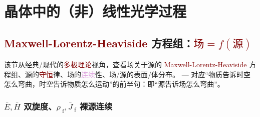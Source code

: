 
\chapter{晶体中的（非）线性光学过程}\label{chap:N/LCO}
\noindent{}
\vspace{-\baselineskip} %

\vspace*{-8.5em}

\section{\textcolor{Maroon}{Maxwell-Lorentz-Heaviside} 方程组：\textcolor{Maroon}{$\text{场} = f(\text{源})$}}\label{sec:maxwell}

该节从经典/现代的\textcolor{Maroon}{多极理论}视角，查看场关于源的 \textcolor{Maroon}{Maxwell-Lorentz-Heaviside} 方程组、源的\textcolor{Maroon}{守恒}律、场的\textcolor{Plum}{连续}性、场/源的表面/体分布。 --- 对应“物质告诉时空怎么弯曲，时空告诉物质怎么运动”的前半句：即“源告诉场怎么弯曲”。

\vspace*{-5.0em}

\subsection{$\bar{E},\bar{H}$ 双旋度、${\rho}_{\;\!\text{f}}, \bar{J}_{\;\!\text{f}}$ 裸源连续}\label{ssec:EHpJf}

